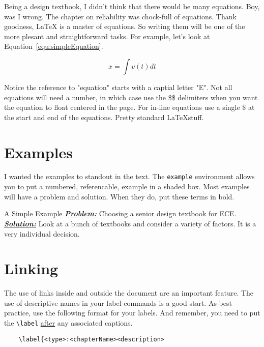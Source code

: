 Being a design textbook, I didn't think that there would be many equations.  Boy, was
I wrong.  The chapter on reliability was chock-full of equations.  Thank goodness, \LaTeX
is a master of equations.  So writing them will be one of the more plesant and straightforward
tasks. For example, let's look at Equation~\ref{equ:simpleEquation}.

\begin{equation}
\label{equ:simpleEquation}
x = \int v(t) dt
\end{equation}

Notice the reference to "equation" starts with a captial letter "E".  Not all equations will
need a number, in which case use the \$\$ delimiters when you want the equation to
float centered in the page.  For in-line equations use a single \$ at the start and end
of the equations.  Pretty standard \LaTeX stuff.

\section{Examples}
\label{section:howToExamples}

I wanted the examples to standout in the text.  The \verb+example+ environment allows
you to put a numbered, referencable, example in a shaded box.  Most examples will have
a problem and solution.  When they do, put these terms in bold.

\begin{example}{A Simple Example}
\label{example:aSimpleExample}
\emph{\textbf{\ul{Problem:}}} Choosing a senior design textbook for ECE. \\	%
\noindent\emph{\textbf{\ul{Solution:}}} Look at a bunch of textbooks and 
consider a variety of factors.  It is a very individual decision.
\end{example}

\section{Linking}
\label{section:howToLinking}
The use of links inside and outside the document are an important feature.  The use
of descriptive names in your label commands is a good start.  As best practice, use
the following format for your labels.  And remember, you need to put the 
\verb+\label+ \ul{after} any associated captions.

\begin{verbatim}
	\label{<type>:<chapterName><description>
\end{verbatim}

